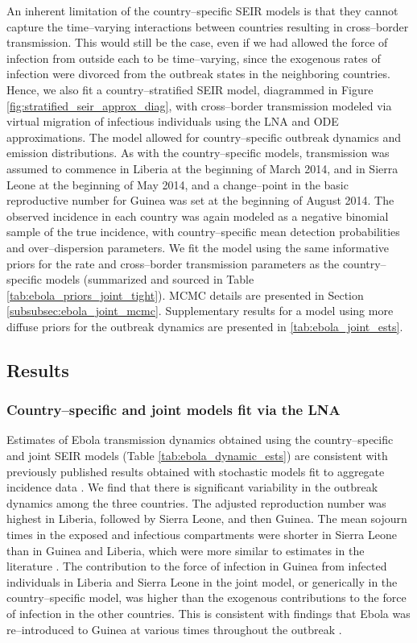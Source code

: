 An inherent limitation of the country--specific SEIR models is that they cannot capture the time--varying interactions between countries resulting in cross--border transmission. This would still be the case, even if we had allowed the force of infection from outside each to be time--varying, since the exogenous rates of infection were divorced from the outbreak states in the neighboring countries. Hence, we also fit a country--stratified SEIR model, diagrammed in Figure \ref{fig:stratified_seir_approx_diag}, with cross--border transmission modeled via virtual migration of infectious individuals using the LNA and ODE approximations. The model allowed for country--specific outbreak dynamics and emission distributions. As with the country--specific models, transmission was assumed to commence in Liberia at the beginning of March 2014, and in Sierra Leone at the beginning of May 2014, and a change--point in the basic reproductive number for Guinea was set at the beginning of August 2014. The observed incidence in each country was again modeled as a negative binomial sample of the true incidence, with country--specific mean detection probabilities and over--dispersion parameters. We fit the model using the same informative priors for the rate and cross--border transmission parameters as the country--specific models (summarized and sourced in Table \ref{tab:ebola_priors_joint_tight}). MCMC details are presented in Section \ref{subsubsec:ebola_joint_mcmc}. Supplementary results for a model using more diffuse priors for the outbreak dynamics are presented in \ref{tab:ebola_joint_ests}.

\subsection{Results}
\label{subsec:ebola_results}

\subsubsection{Country--specific and joint models fit via the LNA}
\label{subsubsec:ebola_lna_results}

Estimates of Ebola transmission dynamics obtained using the country--specific and joint SEIR models (Table \ref{tab:ebola_dynamic_ests}) are consistent with previously published results obtained with stochastic models fit to aggregate incidence data \cite{chretien2015mathematical}. We find that there is significant variability in the outbreak dynamics among the three countries. The adjusted reproduction number was highest in Liberia, followed by Sierra Leone, and then Guinea. The mean sojourn times in the exposed and infectious compartments were shorter in Sierra Leone than in Guinea and Liberia, which were more similar to estimates in the literature \cite{velasquez2015time}. The contribution to the force of infection in Guinea from infected individuals in Liberia and Sierra Leone in the joint model, or generically in the country--specific model, was higher than the exogenous contributions to the force of infection in the other countries. This is consistent with findings that Ebola was re--introduced to Guinea at various times throughout the outbreak \cite{dudas2017virus}. 

